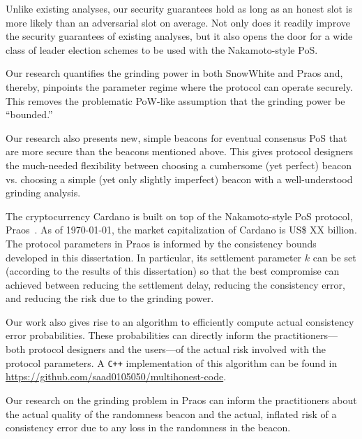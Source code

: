   Unlike existing analyses, 
  our security guarantees hold as long as 
  an honest slot is more likely than an adversarial slot on average. 
  Not only does it readily improve the security guarantees of existing analyses, 
  but it also opens the door for a wide class of leader election schemes to be used 
  with the Nakamoto-style PoS.


  Our research quantifies the grinding power in both SnowWhite and Praos 
  and, thereby, pinpoints the parameter regime where the protocol can operate securely. 
  This removes the problematic PoW-like assumption that the grinding power be ``bounded.''

  Our research also presents new, simple beacons for eventual consensus PoS 
  that are more secure than the beacons mentioned above. 
  This gives protocol designers the much-needed flexibility 
  between choosing a cumbersome (yet perfect) beacon 
  vs. 
  choosing a simple (yet only slightly imperfect) beacon 
  with a well-understood grinding analysis.


  The cryptocurrency Cardano is built on top of the Nakamoto-style PoS protocol, Praos~\cite{Praos}.
  As of \today, 
  the market capitalization of Cardano is {\color{red} US\$ XX billion}. 
  The protocol parameters in Praos is 
  informed by the consistency bounds developed in this dissertation. 
  In particular, its settlement parameter $k$ can be set 
  (according to the results of this dissertation) 
  so that the best compromise can achieved between 
  reducing the settlement delay, 
  reducing the consistency error, 
  and reducing the risk due to the grinding power.

  Our work also gives rise to an algorithm 
  to efficiently compute actual consistency error probabilities. 
  These probabilities can directly inform the practitioners---both protocol designers and the users---of 
  the actual risk involved with the protocol parameters. 
  A \texttt{C++} implementation of this algorithm can be found in 
  \url{https://github.com/saad0105050/multihonest-code}.

  Our research on the grinding problem in Praos 
  can inform the practitioners 
  about the actual quality of the randomness beacon 
  and the actual, inflated risk of a consistency error 
  due to any loss in the randomness in the beacon.


